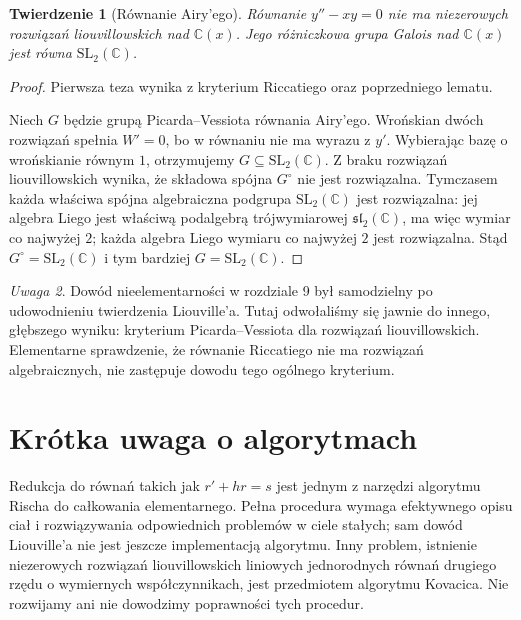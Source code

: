 \documentclass[11pt,a4paper,oneside]{book}
\numberwithin{equation}{section}
\theoremstyle{plain}
\newtheorem{twierdzenie}{Twierdzenie}[chapter]
\theoremstyle{definition}
\theoremstyle{remark}
\newtheorem{uwaga}[twierdzenie]{Uwaga}
\newcommand{\C}{\mathbb{C}}
\begin{document}
\begin{twierdzenie}[Równanie Airy'ego]
Równanie $y''-xy=0$ nie ma niezerowych rozwiązań liouvillowskich nad $\C(x)$. Jego różniczkowa grupa Galois nad $\C(x)$ jest równa $\mathrm{SL}_2(\C)$.
\end{twierdzenie}
\begin{proof}
Pierwsza teza wynika z kryterium Riccatiego oraz poprzedniego lematu.

Niech $G$ będzie grupą Picarda--Vessiota równania Airy'ego. Wrońskian dwóch rozwiązań spełnia $W'=0$, bo w równaniu nie ma wyrazu z $y'$. Wybierając bazę o wrońskianie równym $1$, otrzymujemy $G\subseteq\mathrm{SL}_2(\C)$. Z braku rozwiązań liouvillowskich wynika, że składowa spójna $G^\circ$ nie jest rozwiązalna. Tymczasem każda właściwa spójna algebraiczna podgrupa $\mathrm{SL}_2(\C)$ jest rozwiązalna: jej algebra Liego jest właściwą podalgebrą trójwymiarowej $\mathfrak{sl}_2(\C)$, ma więc wymiar co najwyżej $2$; każda algebra Liego wymiaru co najwyżej $2$ jest rozwiązalna. Stąd $G^\circ=\mathrm{SL}_2(\C)$ i tym bardziej $G=\mathrm{SL}_2(\C)$.
\end{proof}

\begin{uwaga}
Dowód nieelementarności w rozdziale 9 był samodzielny po udowodnieniu twierdzenia Liouville'a. Tutaj odwołaliśmy się jawnie do innego, głębszego wyniku: kryterium Picarda--Vessiota dla rozwiązań liouvillowskich. Elementarne sprawdzenie, że równanie Riccatiego nie ma rozwiązań algebraicznych, nie zastępuje dowodu tego ogólnego kryterium.
\end{uwaga}

\section{Krótka uwaga o algorytmach}

Redukcja do równań takich jak $r'+hr=s$ jest jednym z narzędzi algorytmu Rischa do całkowania elementarnego. Pełna procedura wymaga efektywnego opisu ciał i rozwiązywania odpowiednich problemów w ciele stałych; sam dowód Liouville'a nie jest jeszcze implementacją algorytmu. Inny problem, istnienie niezerowych rozwiązań liouvillowskich liniowych jednorodnych równań drugiego rzędu o wymiernych współczynnikach, jest przedmiotem algorytmu Kovacica. Nie rozwijamy ani nie dowodzimy poprawności tych procedur.
\end{document}
